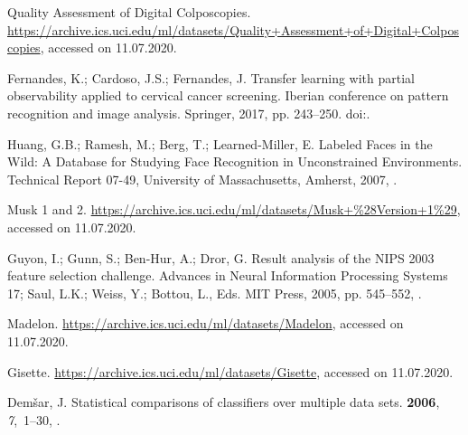 \documentclass[entropy,article,submit,moreauthors,pdftex]{Definitions/mdpi}
\begin{document}
\begin{thebibliography}{-------}
Quality Assessment of Digital Colposcopies.
\newblock
  \url{https://archive.ics.uci.edu/ml/datasets/Quality+Assessment+of+Digital+Colposcopies},
  accessed on 11.07.2020.

Fernandes, K.; Cardoso, J.S.; Fernandes, J.
\newblock Transfer learning with partial observability applied to cervical
  cancer screening.
\newblock  Iberian conference on pattern recognition and image analysis.
  Springer,  2017, pp. 243--250.
\newblock
  doi:{\href{https://doi.org/10.1007/978-3-319-58838-4_27}{}}.

Huang, G.B.; Ramesh, M.; Berg, T.; Learned-Miller, E.
\newblock Labeled Faces in the Wild: A Database for Studying Face Recognition
  in Unconstrained Environments.
\newblock Technical Report 07-49, University of Massachusetts, Amherst,  2007,
  \href{http://vis-www.cs.umass.edu/lfw/lfw.pdf}{{}}.

Musk 1 and 2.
\newblock \url{https://archive.ics.uci.edu/ml/datasets/Musk+%28Version+1%29},
  accessed on 11.07.2020.

Guyon, I.; Gunn, S.; Ben-Hur, A.; Dror, G.
\newblock Result analysis of the {NIPS} 2003 feature selection challenge.
\newblock  Advances in Neural Information Processing Systems 17; Saul, L.K.;
  Weiss, Y.; Bottou, L., Eds. MIT Press,  2005, pp. 545--552,
  \href{http://papers.nips.cc/paper/2728-result-analysis-of-the-nips-2003-feature-selection-challenge.pdf}{{}}.

Madelon.
\newblock \url{https://archive.ics.uci.edu/ml/datasets/Madelon}, accessed on
  11.07.2020.

Gisette.
\newblock \url{https://archive.ics.uci.edu/ml/datasets/Gisette}, accessed on
  11.07.2020.

Dem{\v{s}}ar, J.
\newblock Statistical comparisons of classifiers over multiple data sets.
 {\bf 2006}, {\em 7},~1--30,
  \href{http://www.jmlr.org/papers/volume7/demsar06a/demsar06a.pdf}{{}}.


\end{thebibliography}
\end{document}

